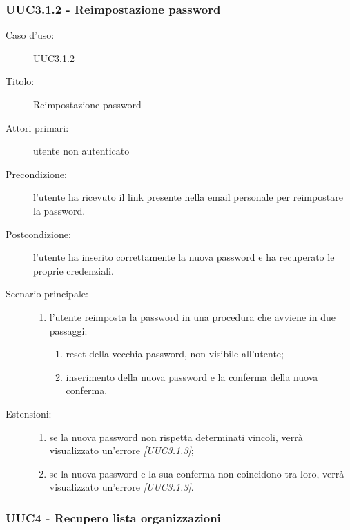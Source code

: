 \documentclass[../analisi-dei-requisiti.tex]{subfiles}
\begin{document}
\subsubsection{UUC3.1.2 - Reimpostazione password}%
\label{subsub:UUC3.1.2utente}
\begin{description}
  \item[Caso d’uso:] UUC3.1.2
  \item[Titolo:] Reimpostazione password
  \item[Attori primari:] utente non autenticato
  \item[Precondizione:] l'utente ha ricevuto il link presente nella email personale per reimpostare la password.
  \item[Postcondizione:] l'utente ha inserito correttamente la nuova password e ha recuperato le proprie credenziali.
  \item[Scenario principale:]
        \begin{enumerate}
          \item l'utente reimposta la password in una procedura che avviene in due passaggi:
                \begin{enumerate}
                  \item reset della vecchia password, non visibile all'utente;
                  \item inserimento della nuova password e la conferma della nuova conferma.
                \end{enumerate}
        \end{enumerate}
  \item[Estensioni:]
        \begin{enumerate}
          \item se la nuova password non rispetta determinati vincoli, verrà visualizzato un'errore \emph{[UUC3.1.3]};
          \item se la nuova password e la sua conferma non coincidono tra loro, verrà visualizzato un'errore \emph{[UUC3.1.3]}.
        \end{enumerate}
\end{description}

\subsubsection{UUC4 - Recupero lista organizzazioni}%
\label{subsub:UUC4utente}
\end{document}
